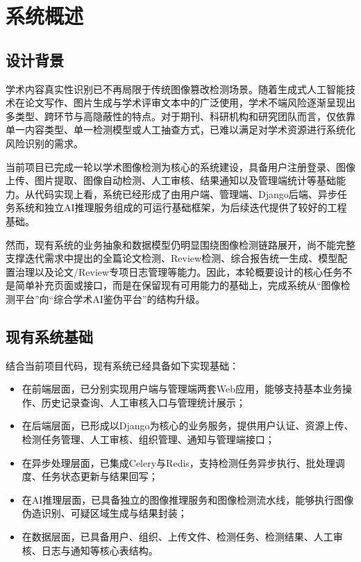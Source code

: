 \section{系统概述}

\subsection{设计背景}
学术内容真实性识别已不再局限于传统图像篡改检测场景。随着生成式人工智能技术在论文写作、图片生成与学术评审文本中的广泛使用，学术不端风险逐渐呈现出多类型、跨环节与高隐蔽性的特点。对于期刊、科研机构和研究团队而言，仅依靠单一内容类型、单一检测模型或人工抽查方式，已难以满足对学术资源进行系统化风险识别的需求。

当前项目已完成一轮以学术图像检测为核心的系统建设，具备用户注册登录、图像上传、图片提取、图像自动检测、人工审核、结果通知以及管理端统计等基础能力。从代码实现上看，系统已经形成了由用户端、管理端、Django后端、异步任务系统和独立AI推理服务组成的可运行基础框架，为后续迭代提供了较好的工程基础。

然而，现有系统的业务抽象和数据模型仍明显围绕图像检测链路展开，尚不能完整支撑迭代需求中提出的全篇论文检测、Review检测、综合报告统一生成、模型配置治理以及论文/Review专项日志管理等能力。因此，本轮概要设计的核心任务不是简单补充页面或接口，而是在保留现有可用能力的基础上，完成系统从“图像检测平台”向“综合学术AI鉴伪平台”的结构升级。

\subsection{现有系统基础}
结合当前项目代码，现有系统已经具备如下实现基础：
\begin{itemize}[leftmargin=2em]
    \item 在前端层面，已分别实现用户端与管理端两套Web应用，能够支持基本业务操作、历史记录查询、人工审核入口与管理统计展示；
    \item 在后端层面，已形成以Django为核心的业务服务，提供用户认证、资源上传、检测任务管理、人工审核、组织管理、通知与管理端接口；
    \item 在异步处理层面，已集成Celery与Redis，支持检测任务异步执行、批处理调度、任务状态更新与结果回写；
    \item 在AI推理层面，已具备独立的图像推理服务和图像检测流水线，能够执行图像伪造识别、可疑区域生成与结果封装；
    \item 在数据层面，已具备用户、组织、上传文件、检测任务、检测结果、人工审核、日志与通知等核心表结构。
\end{itemize}

